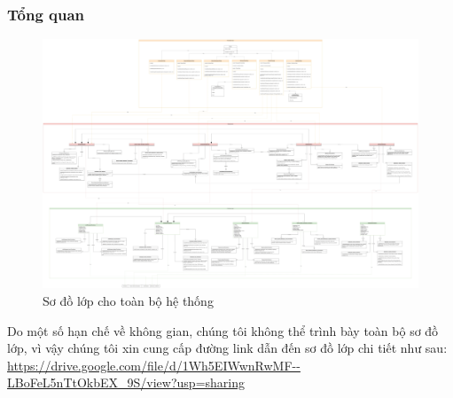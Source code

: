 \subsubsection{Tổng quan}
\begin{figure}[H]
    \centering
    \includegraphics[width=\linewidth]{Content/Phân tích và thiết kế hệ thống/documents/Sơ đồ lớp/images/LayerArchitect.png}
    \vspace{0.5cm}
    \caption{Sơ đồ lớp cho toàn bộ hệ thống}
    \label{fig:Sơ đồ lớp cho toàn bộ hệ thống}
\end{figure}

\par
Do một số hạn chế về không gian, chúng tôi không thể trình bày toàn bộ sơ đồ lớp,
vì vậy chúng tôi xin cung cấp đường link dẫn đến sơ đồ lớp chi tiết như sau:
\url{https://drive.google.com/file/d/1Wh5EIWwnRwMF--LBoFeL5nTtOkbEX_9S/view?usp=sharing}